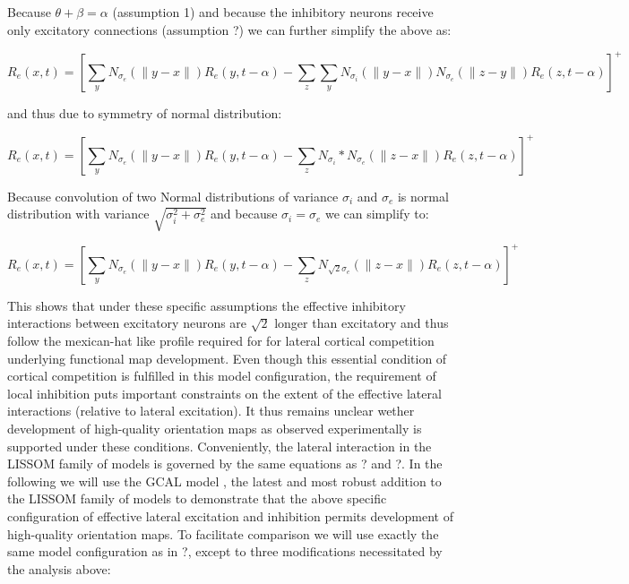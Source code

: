 \documentclass[a4paper,10pt]{article}
\begin{document}
\noindent Because $\theta + \beta = \alpha$ (assumption 1) and because the inhibitory neurons receive only excitatory connections (assumption ?) we can further simplify the above as:


\begin{equation}
R_{e}(x,t) = [\sum_{y}N_{\sigma_{e}}(\lVert y-x \rVert)R_{e}(y,t-\alpha) - \sum_{z}\sum_{y}N_{\sigma_{i}}(\lVert y-x \rVert) N_{\sigma_{e}}(\lVert z-y \rVert) R_{e}(z,t-\alpha)]^+
\end{equation}

\noindent and thus due to symmetry of normal distribution:

\begin{equation}
R_{e}(x,t) = [\sum_{y}N_{\sigma_{e}}(\lVert y-x \rVert)R_{e}(y,t-\alpha) - \sum_{z}N_{\sigma_{i}} \ast  N_{\sigma_{e}}(\lVert z-x \rVert) R_{e}(z,t-\alpha)]^+ 
\end{equation}

\noindent Because convolution of two Normal distributions of variance $\sigma_{i}$  and $\sigma_{e}$ is normal distribution with variance $\sqrt{\sigma_{i}^2 + \sigma_{e}^2}$ and 
because $\sigma_{i} = \sigma_{e}$ we can simplify to:

\begin{equation}
R_{e}(x,t) = [\sum_{y}N_{\sigma_{e}}(\lVert y-x \rVert)R_{e}(y,t-\alpha) - \sum_{z}N_{\sqrt{2}\sigma_{e}}(\lVert z-x \rVert) R_{e}(z,t-\alpha)]^+
\end{equation}

This shows that under these specific assumptions the effective inhibitory interactions between excitatory neurons are $\sqrt{2}$ longer than excitatory and thus
follow the mexican-hat like profile required for for lateral cortical competition underlying functional map development. Even though this essential condition of 
cortical competition is fulfilled in this model configuration, the requirement of local inhibition puts important constraints on the extent of the effective lateral
interactions (relative to lateral excitation). It thus remains unclear wether development of high-quality orientation maps as observed experimentally is 
supported under these conditions. Conveniently, the lateral interaction in the LISSOM family of models is governed by the same equations as ? and ?. 
In the following we will use the GCAL model \cite{?}, the latest and most robust addition to the LISSOM family of models to demonstrate that the above 
specific configuration of effective lateral excitation and inhibition permits development of high-quality orientation maps. To facilitate comparison we will use exactly 
the same model configuration as in ?, except to three modifications necessitated by the analysis above:
\end{document}
